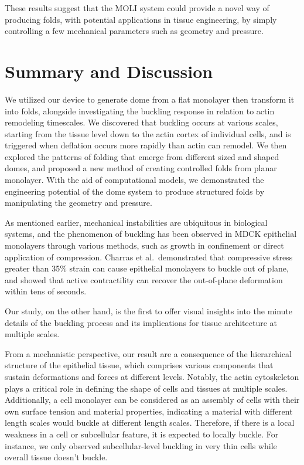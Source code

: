 These results suggest that the MOLI system could provide a novel way of
producing folds, with potential applications in tissue engineering, by
simply controlling a few mechanical parameters such as geometry and
pressure.

\hypertarget{summary-and-discussion-1}{%
	\section{Summary and Discussion}\label{summary-and-discussion-1}}

We utilized our device to generate dome from a flat monolayer then
transform it into folds, alongside investigating the buckling response
in relation to actin remodeling timescales. We discovered that buckling
occurs at various scales, starting from the tissue level down to the
actin cortex of individual cells, and is triggered when deflation occurs
more rapidly than actin can remodel. We then explored the patterns of
folding that emerge from different sized and shaped domes, and proposed
a new method of creating controlled folds from planar monolayer. With
the aid of computational models, we demonstrated the engineering
potential of the dome system to produce structured folds by manipulating
the geometry and pressure.

As mentioned earlier, mechanical instabilities are ubiquitous in
biological systems, and the phenomenon of buckling has been observed in
MDCK epithelial monolayers through various methods, such as growth in
confinement or direct application of compression. Charras et
al.~demonstrated that compressive stress greater than 35\% strain can
cause epithelial monolayers to buckle out of plane, and showed that
active contractility can recover the out-of-plane deformation within
tens of seconds.

Our study, on the other hand, is the first to offer visual insights into
the minute details of the buckling process and its implications for
tissue architecture at multiple scales.

From a mechanistic perspective, our result are a consequence of the
hierarchical structure of the epithelial tissue, which comprises various
components that sustain deformations and forces at different levels.
Notably, the actin cytoskeleton plays a critical role in defining the
shape of cells and tissues at multiple scales. Additionally, a cell
monolayer can be considered as an assembly of cells with their own
surface tension and material properties, indicating a material with
different length scales would buckle at different length scales.
Therefore, if there is a local weakness in a cell or subcellular
feature, it is expected to locally buckle. For instance, we only
observed subcellular-level buckling in very thin cells while overall
tissue doesn't buckle.

